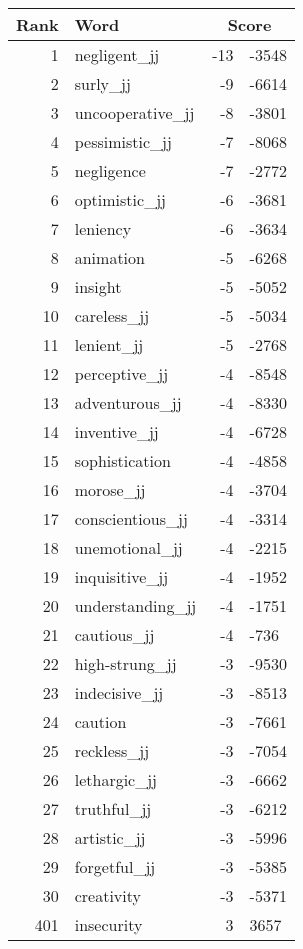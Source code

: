 \begin{longtable}[!htbp]{| rlr@{.}l |}
    \hline
    \textbf{Rank} & \textbf{Word} & \multicolumn{2}{c|}{\textbf{Score}} \\
    \hline
    \endhead
    1 & negligent\_jj & -13 & -3548 \\
    2 & surly\_jj & -9 & -6614 \\
    3 & uncooperative\_jj & -8 & -3801 \\
    4 & pessimistic\_jj & -7 & -8068 \\
    5 & negligence & -7 & -2772 \\
    6 & optimistic\_jj & -6 & -3681 \\
    7 & leniency & -6 & -3634 \\
    8 & animation & -5 & -6268 \\
    9 & insight & -5 & -5052 \\
    10 & careless\_jj & -5 & -5034 \\
    11 & lenient\_jj & -5 & -2768 \\
    12 & perceptive\_jj & -4 & -8548 \\
    13 & adventurous\_jj & -4 & -8330 \\
    14 & inventive\_jj & -4 & -6728 \\
    15 & sophistication & -4 & -4858 \\
    16 & morose\_jj & -4 & -3704 \\
    17 & conscientious\_jj & -4 & -3314 \\
    18 & unemotional\_jj & -4 & -2215 \\
    19 & inquisitive\_jj & -4 & -1952 \\
    20 & understanding\_jj & -4 & -1751 \\
    21 & cautious\_jj & -4 & -736 \\
    22 & high-strung\_jj & -3 & -9530 \\
    23 & indecisive\_jj & -3 & -8513 \\
    24 & caution & -3 & -7661 \\
    25 & reckless\_jj & -3 & -7054 \\
    26 & lethargic\_jj & -3 & -6662 \\
    27 & truthful\_jj & -3 & -6212 \\
    28 & artistic\_jj & -3 & -5996 \\
    29 & forgetful\_jj & -3 & -5385 \\
    30 & creativity & -3 & -5371 \\
    401 & insecurity & 3 & 3657 \\

\end{longtable}
